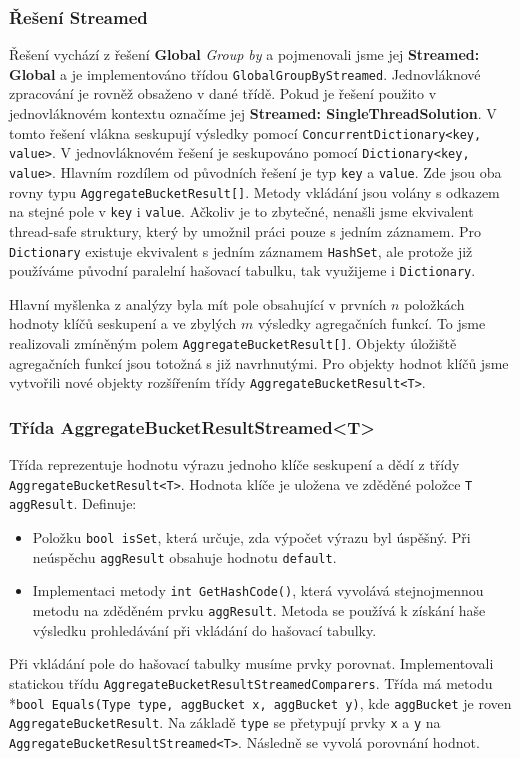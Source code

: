 \subsubsection{Řešení Streamed} \label{impl.improvement.groupby.streamed}

Řešení vychází z řešení \textbf{Global} \textit{Group by} a pojmenovali jsme jej \textbf{Streamed: Global} a je implementováno třídou \texttt{GlobalGroupByStreamed}.
Jednovláknové zpracování je rovněž obsaženo v dané třídě.
Pokud je řešení použito v jednovláknovém kontextu označíme jej \textbf{Streamed: SingleThreadSolution}.
V tomto řešení vlákna seskupují výsledky pomocí \texttt{ConcurrentDictionary<key, value>}.
V jednovláknovém řešení je seskupováno pomocí \texttt{Dictionary<key, value>}.
Hlavním rozdílem od původních řešení je typ \texttt{key} a \texttt{value}.
Zde jsou oba rovny typu \texttt{AggregateBucketResult[]}.
Metody vkládání jsou volány s odkazem na stejné pole v \texttt{key} i \texttt{value}.
Ačkoliv je to zbytečné, nenašli jsme ekvivalent thread-safe struktury, který by umožnil práci pouze s jedním záznamem.
Pro \texttt{Dictionary} existuje ekvivalent s jedním záznamem \texttt{HashSet}, ale protože již používáme původní paralelní hašovací tabulku, tak využijeme i \texttt{Dictionary}. 

Hlavní myšlenka z analýzy byla mít pole obsahující v prvních $n$ položkách hodnoty klíčů seskupení a ve zbylých $m$ výsledky agregačních funkcí.
To jsme realizovali zmíněným polem \texttt{AggregateBucketResult[]}.
Objekty úložiště agregačních funkcí jsou totožná s již navrhnutými.
Pro objekty hodnot klíčů jsme vytvořili nové objekty rozšířením třídy \texttt{AggregateBucketResult<T>}.

\subsubsection{Třída AggregateBucketResultStreamed<T>}

Třída reprezentuje hodnotu výrazu jednoho klíče seskupení a dědí z třídy \texttt{AggregateBucketResult<T>}.
Hodnota klíče je uložena ve zděděné položce \texttt{T aggResult}.
Definuje:
\begin{itemize}
\item Položku \texttt{bool isSet}, která určuje, zda výpočet výrazu byl úspěšný.
Při neúspěchu \texttt{aggResult} obsahuje hodnotu \texttt{default}. 
\item Implementaci metody \texttt{int GetHashCode()}, která vyvolává stejnojmennou metodu na zděděném prvku \texttt{aggResult}.
Metoda se používá k získání haše výsledku prohledávání při vkládání do hašovací tabulky.
\end{itemize}
Při vkládání pole do hašovací tabulky musíme prvky porovnat. 
Implementovali statickou třídu \texttt{AggregateBucketResultStreamedComparers}.
Třída má metodu \\*\texttt{bool Equals(Type type, aggBucket x, aggBucket y)}, kde \texttt{aggBucket} je roven \texttt{AggregateBucketResult}.
Na základě \texttt{type} se přetypují prvky \texttt{x} a \texttt{y} na \texttt{AggregateBucketResultStreamed<T>}.
Následně se vyvolá porovnání hodnot.

